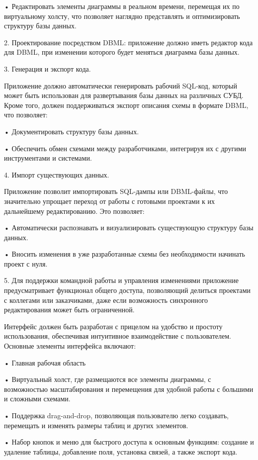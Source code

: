 • Редактировать элементы диаграммы в реальном времени, перемещая их по виртуальному холсту, что позволяет наглядно представлять и оптимизировать структуру базы данных.

2. Проектирование посредством DBML: приложение должно иметь редактор кода для DBML, при изменении которого будет меняться диаграмма базы данных.

3. Генерация и экспорт кода.

Приложение должно автоматически генерировать рабочий SQL-код, который может быть использован для развертывания базы данных на различных СУБД. Кроме того, должен поддерживаться экспорт описания схемы в формате DBML, что позволяет:

• Документировать структуру базы данных.

• Обеспечить обмен схемами между разработчиками, интегрируя их с другими инструментами и системами.


4. Импорт существующих данных.

Приложение позволит импортировать SQL-дампы или DBML-файлы, что значительно упрощает переход от работы с готовыми проектами к их дальнейшему редактированию. Это позволяет:

• Автоматически распознавать и визуализировать существующую структуру базы данных.

• Вносить изменения в уже разработанные схемы без необходимости начинать проект с нуля.


5. Для поддержки командной работы и управления изменениями приложение предусматривает функционал общего доступа, позволяющий делиться проектами с коллегами или заказчиками, даже если возможность синхронного редактирования может быть ограниченной.

Интерфейс должен быть разработан с прицелом на удобство и простоту использования, обеспечивая интуитивное взаимодействие с пользователем. Основные элементы интерфейса включают:

• Главная рабочая область

• Виртуальный холст, где размещаются все элементы диаграммы, с возможностью масштабирования и перемещения для удобной работы с большими и сложными схемами.

• Поддержка drag-and-drop, позволяющая пользователю легко создавать, перемещать и изменять размеры таблиц и других элементов.

• Набор кнопок и меню для быстрого доступа к основным функциям: создание и удаление таблицы, добавление поля, установка связей, а также экспорт кода.

